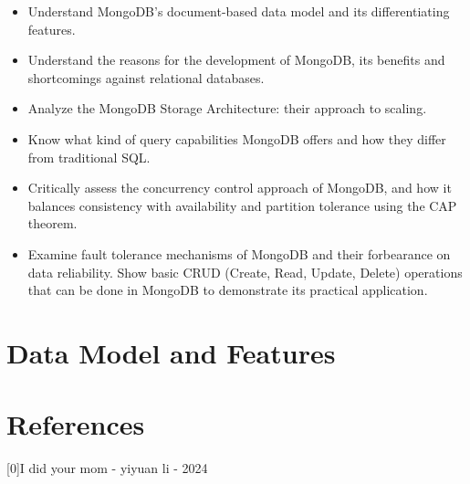 \documentclass[12pt]{article}
\providecommand{\tightlist}{%
  \setlength{\itemsep}{0pt}\setlength{\parskip}{0pt}}
\begin{document}
\begin{itemize}
\tightlist
\item
  Understand MongoDB's document-based data model and its differentiating
  features.
\item
  Understand the reasons for the development of MongoDB, its benefits
  and shortcomings against relational databases.
\item
  Analyze the MongoDB Storage Architecture: their approach to scaling.
\item
  Know what kind of query capabilities MongoDB offers and how they
  differ from traditional SQL.
\item
  Critically assess the concurrency control approach of MongoDB, and how
  it balances consistency with availability and partition tolerance
  using the CAP theorem.
\item
  Examine fault tolerance mechanisms of MongoDB and their forbearance on
  data reliability. Show basic CRUD (Create, Read, Update, Delete)
  operations that can be done in MongoDB to demonstrate its practical
  application.
\end{itemize}

\section{Data Model and Features}\label{data-model-and-features}

\section{References}\label{references}

{[}0{]}I did your mom - yiyuan li - 2024 %

\printbibliography[heading=bibintoc, title={References}] %
\end{document}
